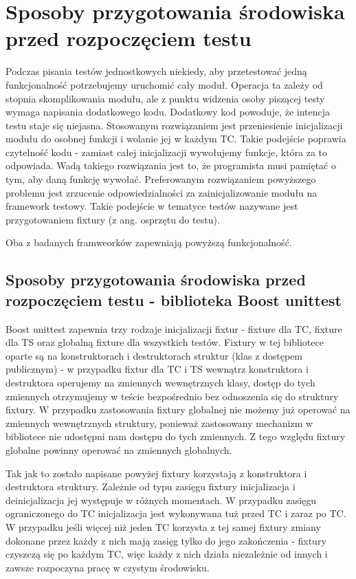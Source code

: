 \documentclass[12pt,a4paper,notitlepage]{report}
\begin{document}
\section{Sposoby przygotowania środowiska przed rozpoczęciem testu}

Podczas pisania testów jednostkowych niekiedy, aby przetestować jedną funkcjonalność potrzebujemy uruchomić cały moduł. Operacja ta zależy od stopnia skomplikowania modułu, ale z punktu widzenia osoby piszącej testy wymaga napisania dodatkowego kodu. Dodatkowy kod powoduje, że intencja testu staje się niejasna. 
Stosowanym rozwiązaniem jest przeniesienie inicjalizacji modułu do osobnej funkcji i wolanie jej w każdym TC. Takie podejście poprawia czytelność kodu - zamiast całej inicjalizacji wywołujemy funkcje, która za to odpowiada. Wadą takiego rozwiązania jest to, że programista musi pamiętać o tym, aby daną funkcję wywołać.
Preferowanym rozwiązaniem powyższego problemu jest zrzucenie odpowiedzialności za zainicjalizowanie modułu na framework testowy. Takie podejście w tematyce testów nazywane jest przygotowaniem fixtury (z ang. osprzętu do testu).

Oba z badanych framweorków zapewniają powyższą funkcjonalność.

\subsection{Sposoby przygotowania środowiska przed rozpoczęciem testu - biblioteka Boost unittest}

Boost unittest zapewnia trzy rodzaje inicjalizacji fixtur - fixture dla TC, fixture dla TS oraz globalną fixture dla wszystkich testów. Fixtury w tej bibliotece oparte są na konstruktorach i destruktorach struktur (klas z dostępem publicznym) - w przypadku fixtur dla TC i TS wewnątrz konstruktora i destruktora operujemy na zmiennych wewnętrznych klasy, dostęp do tych zmiennych otrzymujemy w teście bezpośrednio bez odnoszenia się do struktury fixtury.
W przypadku zastosowania fixtury globalnej nie możemy już operować na zmiennych wewnętrznych struktury, ponieważ zastosowany mechanizm w bibliotece nie udostępni nam dostępu do tych zmiennych. Z tego względu fixtury globalne powinny operować na zmiennych globalnych.

Tak jak to zostało napisane powyżej fixtury korzystają z konstruktora i destruktora struktury. Zależnie od typu zasięgu fixtury inicjalizacja i deinicjalizacja jej występuje w różnych momentach. W przypadku zasięgu ograniczonego do TC inicjalizacja jest wykonywana tuż przed TC i zaraz po TC. W przypadku jeśli więcej niż jeden TC korzysta z tej samej fixtury zmiany dokonane przez każdy z nich mają zasięg tylko do jego zakończenia - fixtury czyszczą się po każdym TC, więc każdy z nich działa niezależnie od innych i zawsze rozpoczyna pracę w czystym środowisku.
\end{document}
